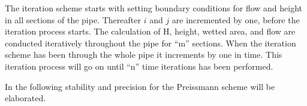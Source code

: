 The iteration scheme starts with setting boundary conditions for flow and height in all sections of the pipe. Thereafter $i$ and $j$ are incremented by one, before the iteration process starts. The calculation of H, height, wetted area, and flow are conducted iteratively throughout the pipe for ``m'' sections.
When the iteration scheme has been through the whole pipe it increments by one in time. This iteration process will go on until ``n'' time iterations has been performed.   

In the following stability and precision for the Preissmann scheme will be elaborated. %


